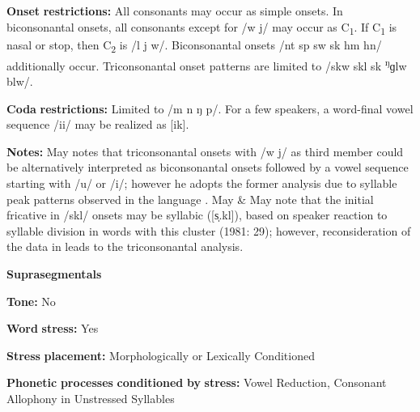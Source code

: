 \begin{styleBody}
\textbf{Onset} \textbf{restrictions:} All consonants may occur as simple onsets. In biconsonantal onsets, all consonants except for /w j/ may occur as C\textsubscript{1}. If C\textsubscript{1} is nasal or stop, then C\textsubscript{2} is /l j w/. Biconsonantal onsets /nt sp sw sk hm hn/ additionally occur. Triconsonantal onset patterns are limited to /skw skl sk \textsuperscript{ŋ}ɡlw blw/.
\end{styleBody}

\begin{styleBody}
\textbf{Coda} \textbf{restrictions:} Limited to /m n ŋ p/. For a few speakers, a word-final vowel sequence /ii/ may be realized as [ik].
\end{styleBody}

\begin{styleBody}
\textbf{Notes:} May notes that triconsonantal onsets with /w j/ as third member could be alternatively interpreted as biconsonantal onsets followed by a vowel sequence starting with /u/ or /i/; however he adopts the former analysis due to syllable peak patterns observed in the language \citep[17-18]{May1997}. May \& May note that the initial fricative in /skl/ onsets may be syllabic ([s̩.kl]), based on speaker reaction to syllable division in words with this cluster (1981: 29); however, reconsideration of the data in \citealt{May1997} leads to the triconsonantal analysis.
\end{styleBody}

\begin{styleBody}
\textbf{Suprasegmentals}
\end{styleBody}

\begin{styleBody}
\textbf{Tone:} No
\end{styleBody}

\begin{styleBody}
\textbf{Word} \textbf{stress:} Yes
\end{styleBody}

\begin{styleBody}
\textbf{Stress} \textbf{placement:} Morphologically or Lexically Conditioned
\end{styleBody}

\begin{styleBody}
\textbf{Phonetic} \textbf{processes} \textbf{conditioned} \textbf{by} \textbf{stress:} Vowel Reduction, Consonant Allophony in Unstressed Syllables
\end{styleBody}

